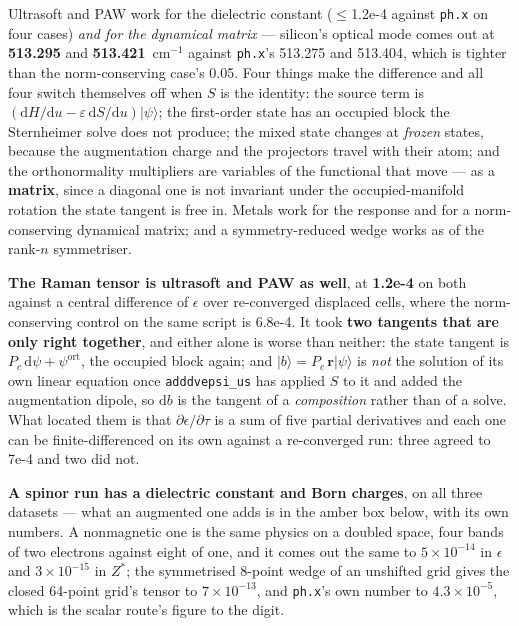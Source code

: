 \documentclass[11pt,a4paper]{article}
\newcommand{\code}[1]{\texttt{\small #1}}
\begin{document}
Ultrasoft and PAW work for the dielectric constant ($\le$1.2e-4 against
\code{ph.x} on four cases) \emph{and for the dynamical matrix} --- silicon's
optical mode comes out at \textbf{513.295} and \textbf{513.421}~cm$^{-1}$
against \code{ph.x}'s 513.275 and 513.404, which is tighter than the
norm-conserving case's 0.05. Four things make the difference and all four
switch themselves off when $S$ is the identity: the source term is
$(\mathrm{d}H/\mathrm{d}u - \varepsilon\,\mathrm{d}S/\mathrm{d}u)|\psi\rangle$;
the first-order state has an occupied block the Sternheimer solve does not
produce; the mixed state changes at \emph{frozen} states, because the
augmentation charge and the projectors travel with their atom; and the
orthonormality multipliers are variables of the functional that move --- as a
\textbf{matrix}, since a diagonal one is not invariant under the
occupied-manifold rotation the state tangent is free in. Metals work for the
response and for a norm-conserving dynamical matrix; and a symmetry-reduced
wedge works as of the rank-$n$ symmetriser.

\textbf{The Raman tensor is ultrasoft and PAW as well}, at \textbf{1.2e-4} on
both against a central difference of $\epsilon$ over re-converged displaced
cells, where the norm-conserving control on the same script is 6.8e-4. It took
\textbf{two tangents that are only right together}, and either alone is worse
than neither: the state tangent is $P_c\,\mathrm{d}\psi + \psi^{\mathrm{ort}}$,
the occupied block again; and $|b\rangle = P_c\,\mathbf r|\psi\rangle$ is
\emph{not} the solution of its own linear equation once \code{adddvepsi\_us}
has applied $S$ to it and added the augmentation dipole, so $\mathrm{d}b$ is
the tangent of a \emph{composition} rather than of a solve. What located them
is that $\partial\epsilon/\partial\tau$ is a sum of five partial derivatives
and each one can be finite-differenced on its own against a re-converged run:
three agreed to 7e-4 and two did not.

\textbf{A spinor run has a dielectric constant and Born charges}, on all three
datasets --- what an augmented one adds is in the amber box below, with its own
numbers. A nonmagnetic one is the same physics on a doubled
space, four bands of two electrons against eight of one, and it comes out the
same to $5\times10^{-14}$ in $\epsilon$ and $3\times10^{-15}$ in $Z^{\ast}$;
the symmetrised 8-point wedge of an unshifted grid gives the closed 64-point
grid's tensor to $7\times10^{-13}$, and \code{ph.x}'s own number to
$4.3\times10^{-5}$, which is the scalar route's figure to the digit.
\end{document}
